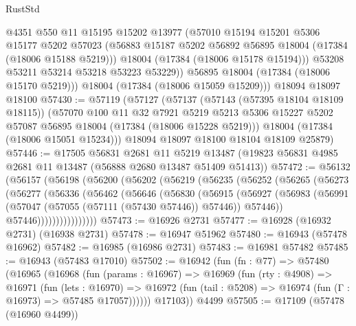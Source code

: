 \begin{lexlean}{RustStd}
\begin{coremodule}
            @4351
            @550
            @11
            @15195
            @15202
            @13977
            (@57010
              @15194
              @15201
              @5306
              @15177
              @5202
              @57023
              (@56883 @15187 @5202 @56892 @56895 @18004 (@17384 (@18006 @15188 @5219)))
              @18004
              (@17384 (@18006 @15178 @15194)))
            @53208
            @53211
            @53214
            @53218
            @53223
            @53229))
        @56895
        @18004
        (@17384 (@18006 @15170 @5219)))
      @18004
      (@17384 (@18006 @15059 @15209)))
    @18094
    @18097
    @18100
@57430 := @57119
    (@57127
      (@57137
        (@57143 (@57395 @18104 @18109 @18115))
        (@57070
          @100
          @11
          @32
          @7921
          @5219
          @5213
          @5306
          @15227
          @5202
          @57087
          @56895
          @18004
          (@17384 (@18006 @15228 @5219)))
        @18004
        (@17384 (@18006 @15051 @15234)))
      @18094
      @18097
      @18100
      @18104
      @18109
      @25879)
@57446 := @17505
    @56831
    @2681
    @11
    @5219
    @13487
    (@19823 @56831 @4985 @2681 @11 @13487 (@56888 @2680 @13487 @51409 @51413))
@57472 := @56132
    (@56157
      (@56198
        (@56200
          (@56202
            (@56219
              (@56235
                (@56252
                  (@56265
                    (@56273
                      (@56277
                        (@56336
                          (@56462
                            (@56646
                              (@56830
                                (@56915
                                  (@56927
                                    (@56983
                                      (@56991
                                        (@57047 (@57055 (@57111 (@57430 @57446)) @57446))
                                        @57446))
                                    @57446))))))))))))))))
@57473 := @16926 @2731
@57477 := @16928 (@16932 @2731) (@16938 @2731)
@57478 := @16947 @51962
@57480 := @16943 (@57478 @16962)
@57482 := @16985 (@16986 @2731)
@57483 := @16981 @57482
@57485 := @16943 (@57483 @17010)
@57502 := @16942
    (fun (fn : @77) =>
    @57480
      (@16965
        (@16968
          (fun (params : @16967) =>
          @16969
            (fun (rty : @4908) =>
            @16971
              (fun (lets : @16970) =>
              @16972 (fun (tail : @5208) => @16974 (fun (Γ : @16973) => @57485 @17057))))))
        @17103))
    @4499
@57505 := @17109 (@57478 (@16960 @4499))

\end{coremodule}
\end{lexlean}
